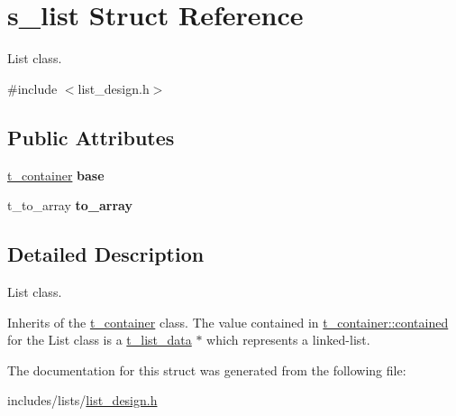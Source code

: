 \hypertarget{structs__list}{}\section{s\+\_\+list Struct Reference}
\label{structs__list}


List class.  




{\ttfamily \#include $<$list\+\_\+design.\+h$>$}

\subsection*{Public Attributes}
\begin{DoxyCompactItemize}
\item 
\hyperlink{container__design_8h_a2baa2855e4617ebc7ad317f13fda1cbe}{t\+\_\+container} {\bfseries base}\hypertarget{structs__list_ab12d0bc06a7b7d5499dff9e7340552c2}{}\label{structs__list_ab12d0bc06a7b7d5499dff9e7340552c2}

\item 
t\+\_\+to\+\_\+array {\bfseries to\+\_\+array}\hypertarget{structs__list_a227f33bc5c6cc9e0d25e067c2573338f}{}\label{structs__list_a227f33bc5c6cc9e0d25e067c2573338f}

\end{DoxyCompactItemize}


\subsection{Detailed Description}
List class. 

Inherits of the \hyperlink{container__design_8h_a2baa2855e4617ebc7ad317f13fda1cbe}{t\+\_\+container} class. The value contained in \hyperlink{structs__container_a46a37b6427c9569f29422c515529a48b}{t\+\_\+container\+::contained} for the List class is a {\ttfamily \hyperlink{list__design_8h_a36a1af2b742ad9ec3f53f0f14806772a}{t\+\_\+list\+\_\+data} $\ast$} which represents a linked-\/list. 

The documentation for this struct was generated from the following file\+:\begin{DoxyCompactItemize}
\item 
includes/lists/\hyperlink{list__design_8h}{list\+\_\+design.\+h}\end{DoxyCompactItemize}
